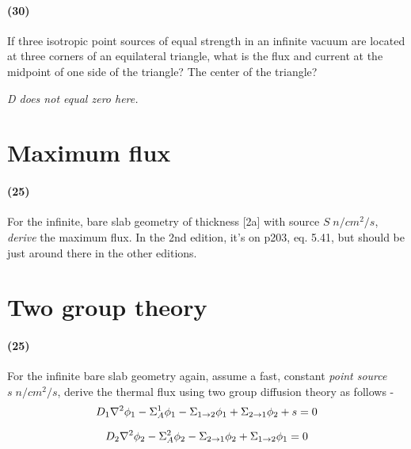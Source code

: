 \documentclass[11pt,a4paper]{article}
\begin{document}
\paragraph*{(30)}
If three isotropic point sources of equal strength in an infinite vacuum are located at three corners of an equilateral triangle, what is the flux and current at the midpoint of one side of the triangle? The center of the triangle? 

\vspace{\baselineskip}

\noindent\textit{D does not equal zero here.}





\newpage

\section{Maximum flux}
\paragraph*{(25)}
For the infinite, bare slab geometry of thickness [2a] with source $S \; n/cm^2/s$, \textit{derive} the maximum flux. In the 2nd edition, it's on p203, eq. 5.41, but should be just around there in the other editions.





\newpage

\section{Two group theory}
\paragraph*{(25)}
For the infinite bare slab geometry again, assume a fast, constant \textit{point source} $s \; n/cm^2/s$, derive the thermal flux using two group diffusion theory as follows -
\begin{equation} \label{eq-fast-flux}
    \large D_1\nabla^2{\phi_1}-\Sigma_A^1\phi_1-\Sigma_{1 \rightarrow 2}\phi_1+\Sigma_{2 \rightarrow 1}\phi_2+s=0
\end{equation}

\begin{equation} \label{eq-thermal-flux}
    \large D_2\nabla^2{\phi_2}-\Sigma_A^2\phi_2-\Sigma_{2 \rightarrow 1}\phi_2+\Sigma_{1 \rightarrow 2}\phi_1=0
\end{equation}
\end{document}
